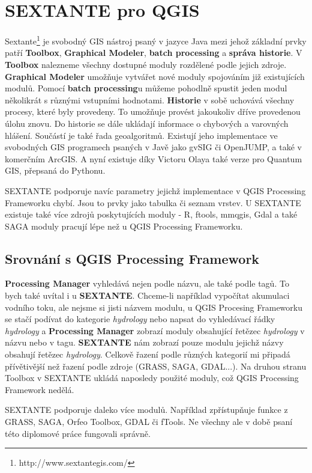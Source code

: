 \newpage
\chapter{SEXTANTE pro QGIS}
Sextante\footnote{http://www.sextantegis.com/} je svobodný GIS nástroj psaný v jazyce Java mezi jehož základní prvky patří \textbf{Toolbox}, \textbf{Graphical Modeler}, \textbf{batch processing} a \textbf{správa historie}. V \textbf{Toolbox} nalezneme všechny dostupné moduly rozdělené podle jejich zdroje. \textbf{Graphical Modeler} umožňuje vytvářet nové moduly spojováním již existujících modulů. Pomocí \textbf{batch processing}u můžeme pohodlně spustit jeden modul několikrát s různými vstupními hodnotami. \textbf{Historie} v sobě uchovává všechny procesy, které byly provedeny. To umožňuje provést jakoukoliv dříve provedenou úlohu znovu. Do historie se dále ukládají informace o chybových a varovných hlášení. Součástí je také řada geoalgoritmů. Existují jeho implementace ve svobodných GIS programech psaných v Javě jako gvSIG či OpenJUMP, a také v komerčním ArcGIS. A nyní existuje díky Victoru Olaya také verze pro Quantum GIS, přepsaná do Pythonu.

SEXTANTE podporuje navíc parametry jejichž implementace v QGIS Processing Frameworku chybí. Jsou to prvky jako tabulka či seznam vrstev. U SEXTANTE existuje také více zdrojů poskytujících moduly - R, ftools, mmqgis, Gdal a také SAGA moduly pracují lépe než u QGIS Processing Frameworku.

\section{Srovnání s QGIS Processing Framework}
\textbf{Processing Manager} vyhledává nejen podle názvu, ale také podle tagů. To bych také uvítal i u \textbf{SEXTANTE}. Chceme-li například vypočítat akumulaci vodního toku, ale nejsme si jisti názvem modulu, u QGIS Procesing Frameworku se stačí podívat do kategorie \textit{hydrology} nebo napsat do vyhledávací řádky \textit{hydrology} a \textbf{Processing Manager} zobrazí moduly obsahující řetězec \textit{hydrology} v názvu nebo v tagu. \textbf{SEXTANTE} nám zobrazí pouze modulu jejichž názvy obsahují řetězec \textit{hydrology}. Celkově řazení podle různých kategorií mi připadá přívětivější než řazení podle zdroje (GRASS, SAGA, GDAL...). Na druhou stranu Toolbox v SEXTANTE ukládá naposledy použité moduly, což QGIS Processing Framework nedělá. 

SEXTANTE podporuje daleko více modulů. Například zpřístupňuje funkce z GRASS, SAGA, Orfeo Toolbox, GDAL či fTools. Ne všechny ale v době psaní této diplomové práce fungovali správně. 

